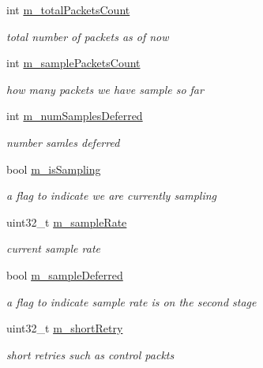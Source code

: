 \begin{DoxyCompactItemize}
int \hyperlink{structns3_1_1MinstrelWifiRemoteStation_a7a0c1cf63d7b7ce3bd25dda10db7f7e7}{m\+\_\+total\+Packets\+Count}
\begin{DoxyCompactList}\small\item\em total number of packets as of now \end{DoxyCompactList}\item 
int \hyperlink{structns3_1_1MinstrelWifiRemoteStation_abad4f1b41d39ec2a0f1a7f7c3516ccf0}{m\+\_\+sample\+Packets\+Count}
\begin{DoxyCompactList}\small\item\em how many packets we have sample so far \end{DoxyCompactList}\item 
int \hyperlink{structns3_1_1MinstrelWifiRemoteStation_a73797674efeaddba87dd052940125293}{m\+\_\+num\+Samples\+Deferred}
\begin{DoxyCompactList}\small\item\em number samles deferred \end{DoxyCompactList}\item 
bool \hyperlink{structns3_1_1MinstrelWifiRemoteStation_a8114992df4a3a1984836c61c6a1a1298}{m\+\_\+is\+Sampling}
\begin{DoxyCompactList}\small\item\em a flag to indicate we are currently sampling \end{DoxyCompactList}\item 
uint32\+\_\+t \hyperlink{structns3_1_1MinstrelWifiRemoteStation_a8ad580c92efbc6d679e95d8432746a22}{m\+\_\+sample\+Rate}
\begin{DoxyCompactList}\small\item\em current sample rate \end{DoxyCompactList}\item 
bool \hyperlink{structns3_1_1MinstrelWifiRemoteStation_ab36a5b37c62921da5aa7b58de4b05ca7}{m\+\_\+sample\+Deferred}
\begin{DoxyCompactList}\small\item\em a flag to indicate sample rate is on the second stage \end{DoxyCompactList}\item 
uint32\+\_\+t \hyperlink{structns3_1_1MinstrelWifiRemoteStation_a900b790146ac5bce9304d0f8aa32f3d3}{m\+\_\+short\+Retry}
\begin{DoxyCompactList}\small\item\em short retries such as control packts \end{DoxyCompactList}\item 

\end{DoxyCompactItemize}

